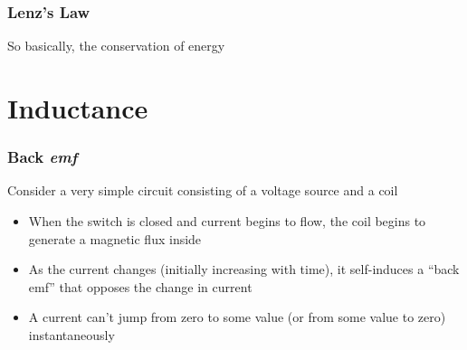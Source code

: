 \documentclass[12pt,aspectratio=169]{beamer}
\begin{document}
\begin{frame}
  \frametitle{Lenz's Law}
  \begin{center}
  \end{center}

  \vspace{.2in}So basically, the conservation of energy
\end{frame}


\section{Inductance}


\begin{frame}
  \frametitle{Back \emph{emf}}
  Consider a very simple circuit consisting of a voltage source and a coil
  \begin{center}
  \end{center}
  \begin{itemize}
  \item When the switch is closed and current begins to flow, the coil
    begins to generate a magnetic flux inside
  \item As the current changes (initially increasing with time), it
    self-induces a ``back emf'' that opposes the change in current
  \item A current can't jump from zero to some value (or from some value to
    zero) instantaneously
  \end{itemize}
\end{frame}
\end{document}
